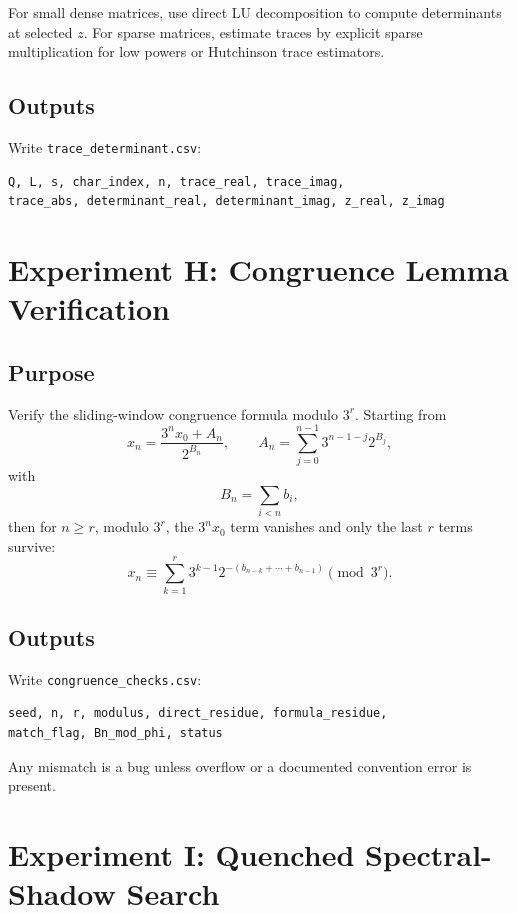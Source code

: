 \documentclass[11pt]{article}
\begin{document}
For small dense matrices, use direct LU decomposition to compute determinants at selected \(z\).  For sparse matrices, estimate traces by explicit sparse multiplication for low powers or Hutchinson trace estimators.

\subsection{Outputs}

Write \texttt{trace\_determinant.csv}:
\begin{lstlisting}
Q, L, s, char_index, n, trace_real, trace_imag,
trace_abs, determinant_real, determinant_imag, z_real, z_imag
\end{lstlisting}

\section{Experiment H: Congruence Lemma Verification}

\subsection{Purpose}

Verify the sliding-window congruence formula modulo \(3^r\).  Starting from
\[
        x_n=\frac{3^n x_0+A_n}{2^{B_n}},
        \qquad
        A_n=\sum_{j=0}^{n-1}3^{n-1-j}2^{B_j},
\]
with
\[
        B_n=\sum_{i<n}b_i,
\]
then for \(n\ge r\), modulo \(3^r\), the \(3^n x_0\) term vanishes and only the last \(r\) terms survive:
\[
        x_n
        \equiv
        \sum_{k=1}^{r}
        3^{k-1}2^{-(b_{n-k}+\cdots+b_{n-1})}
        \pmod{3^r}.
\]

\subsection{Outputs}

Write \texttt{congruence\_checks.csv}:
\begin{lstlisting}
seed, n, r, modulus, direct_residue, formula_residue,
match_flag, Bn_mod_phi, status
\end{lstlisting}

Any mismatch is a bug unless overflow or a documented convention error is present.

\section{Experiment I: Quenched Spectral-Shadow Search}
\end{document}
